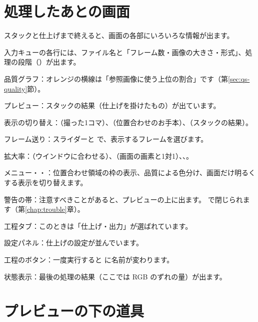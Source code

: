 \section{処理したあとの画面}

スタックと仕上げまで終えると、画面の各部にいろいろな情報が出ます。


\begin{marklist}
  \item 入力キューの各行には、ファイル名と「フレーム数・画像の大きさ・形式」、処理の段階（）が出ます。
  \item 品質グラフ：オレンジの横線は「参照画像に使う上位の割合」です（第\ref{sec:qs-quality}節）。
  \item プレビュー：スタックの結果（仕上げを掛けたもの）が出ています。
  \item 表示の切り替え：（撮った1コマ）、（位置合わせのお手本）、（スタックの結果）。
  \item フレーム送り：スライダーと  で、表示するフレームを選びます。
  \item 拡大率：（ウインドウに合わせる）、（画面の画素と1対1）、、。
  \item {} メニュー・・：位置合わせ領域の枠の表示、品質による色分け、画面だけ明るくする表示を切り替えます。
  \item 警告の帯：注意すべきことがあると、プレビューの上に出ます。 で閉じられます（第\ref{chap:trouble}章）。
  \item 工程タブ：このときは「仕上げ・出力」が選ばれています。
  \item 設定パネル：仕上げの設定が並んでいます。
  \item 工程のボタン：一度実行すると  に名前が変わります。
  \item 状態表示：最後の処理の結果（ここでは RGB のずれの量）が出ます。
\end{marklist}

\section{プレビューの下の道具}\label{sec:toolbar}

